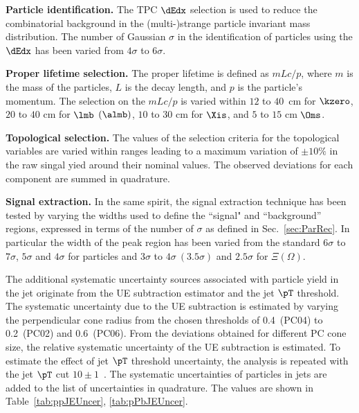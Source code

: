 \documentclass[ALICE,manyauthors]{cernphprep}
\begin{document}
\textbf{Particle identification.} The TPC $\dEdx$ selection is used to reduce the combinatorial background in the (multi-)strange particle invariant mass distribution.
The number of Gaussian $\sigma$ in the identification of particles using the $\dEdx$ has been varied from $4\sigma$ to $6\sigma$.

\textbf{Proper lifetime selection.} The proper lifetime is defined as $mLc/p$, where $m$ is the mass of the particles, $L$ is the decay length, and $p$ is the particle's momentum.
The selection on the $mLc/p$ is varied within $12$ to $40$~cm for $\kzero$, $20$ to $40$ cm for $\lmb$ $(\almb)$, $10$ to $30$ cm for $\Xis$, and $5$ to $15$ cm $\Oms$.

\textbf{Topological selection.} The values of the selection criteria for the topological variables are varied within ranges leading to a maximum variation of $\pm 10\%$ in the raw singal yied around their nominal values.
The observed deviations for each component are summed in quadrature.

\textbf{Signal extraction.} In the same spirit, the signal extraction technique has been tested by varying the widths used to define the ``signal" and ``background'' regions, expressed in terms of the number of $\sigma$ as defined in Sec.~\ref{sec:ParRec}.
In particular the width of the peak region has been varied from the standard $6\sigma$ to $7\sigma$, $5\sigma$ and $4\sigma$ for \Vzero particles and  $3\sigma$ to $4\sigma~(3.5\sigma)$ and $2.5\sigma$ for $\Xi(\Omega)$.

The additional systematic uncertainty sources associated with particle yield in the jet originate from the UE subtraction estimator and the jet $\pT$ threshold.
The systematic uncertainty due to the UE subtraction is estimated by varying the perpendicular cone radius from the chosen thresholds of 0.4~(PC04) to 0.2~(PC02) and 0.6~(PC06).
From the deviations obtained for different PC cone size, the relative systematic uncertainty of the UE subtraction is estimated.
To estimate the effect of jet $\pT$ threshold uncertainty, the analysis is repeated with the jet $\pT$ cut $10\pm 1$~\GeVc.
The systematic uncertainties of particles in jets are added to the list of uncertainties in quadrature.
The values are shown in Table~\ref{tab:ppJEUncer}, \ref{tab:pPbJEUncer}.
\end{document}
